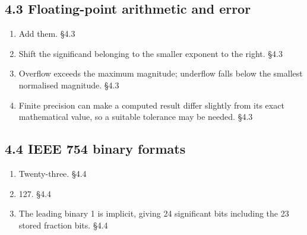 \documentclass[11pt]{article}
\begin{document}
\begin{keepsection}\subsection{4.3 Floating-point arithmetic and error}

\begin{enumerate}
\item Add them. \hfill{\small\color{FAUblue}§4.3}
\item Shift the significand belonging to the smaller exponent to the right. \hfill{\small\color{FAUblue}§4.3}
\item Overflow exceeds the maximum magnitude; underflow falls below the smallest normalised magnitude. \hfill{\small\color{FAUblue}§4.3}
\item Finite precision can make a computed result differ slightly from its exact mathematical value, so a suitable tolerance may be needed. \hfill{\small\color{FAUblue}§4.3}
\end{enumerate}

\end{keepsection}
\begin{keepsection}\subsection{4.4 IEEE 754 binary formats}

\begin{enumerate}
\item Twenty-three. \hfill{\small\color{FAUblue}§4.4}
\item 127. \hfill{\small\color{FAUblue}§4.4}
\item The leading binary 1 is implicit, giving 24 significant bits including the 23 stored fraction bits. \hfill{\small\color{FAUblue}§4.4}
\end{enumerate}

\end{keepsection}
\end{document}
